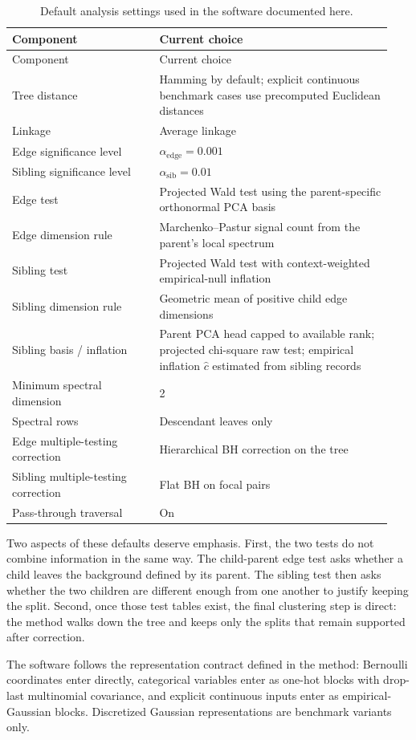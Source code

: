 \begin{longtable}{@{}p{0.36\linewidth}p{0.58\linewidth}@{}}
\caption{Default analysis settings used in the software documented here.}
\label{tab:defaults}\\
\toprule
Component & Current choice \\
\midrule
\endfirsthead
\toprule
Component & Current choice \\
\midrule
\endhead
\bottomrule
\endfoot
Tree distance & Hamming by default; explicit continuous benchmark cases use precomputed Euclidean distances \\
Linkage & Average linkage \\
Edge significance level & $\alpha_{\mathrm{edge}} = 0.001$ \\
Sibling significance level & $\alpha_{\mathrm{sib}} = 0.01$ \\
Edge test & Projected Wald test using the parent-specific orthonormal PCA basis \\
Edge dimension rule & Marchenko--Pastur signal count from the parent's local spectrum \\
Sibling test & Projected Wald test with context-weighted empirical-null inflation \\
Sibling dimension rule & Geometric mean of positive child edge dimensions \\
Sibling basis / inflation & Parent PCA head capped to available rank; projected chi-square raw test; empirical inflation $\hat c$ estimated from sibling records \\
Minimum spectral dimension & 2 \\
Spectral rows & Descendant leaves only \\
Edge multiple-testing correction & Hierarchical BH correction on the tree \\
Sibling multiple-testing correction & Flat BH on focal pairs \\
Pass-through traversal & On \\
\end{longtable}

Two aspects of these defaults deserve emphasis. First, the two tests do not
combine information in the same way. The child-parent edge test asks whether a
child leaves the background defined by its parent. The sibling test then asks
whether the two children are different enough from one another to justify
keeping the split. Second, once those test tables exist, the final clustering
step is direct: the method walks down the tree and keeps only the splits that
remain supported after correction.

The software follows the representation contract defined in the method:
Bernoulli coordinates enter directly, categorical variables enter as one-hot
blocks with drop-last multinomial covariance, and explicit continuous inputs
enter as empirical-Gaussian blocks. Discretized Gaussian representations are
benchmark variants only.
